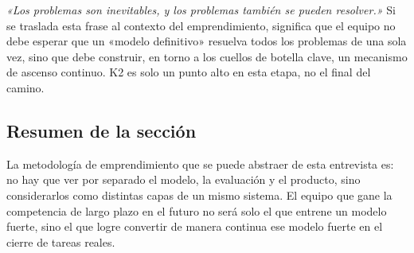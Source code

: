 \textit{«Los problemas son inevitables, y los problemas también se pueden resolver.»} Si se traslada esta frase al contexto del emprendimiento, significa que el equipo no debe esperar que un «modelo definitivo» resuelva todos los problemas de una sola vez, sino que debe construir, en torno a los cuellos de botella clave, un mecanismo de ascenso continuo. K2 es solo un punto alto en esta etapa, no el final del camino.

\subsection{Resumen de la sección}
La metodología de emprendimiento que se puede abstraer de esta entrevista es: no hay que ver por separado el modelo, la evaluación y el producto, sino considerarlos como distintas capas de un mismo sistema. El equipo que gane la competencia de largo plazo en el futuro no será solo el que entrene un modelo fuerte, sino el que logre convertir de manera continua ese modelo fuerte en el cierre de tareas reales.
